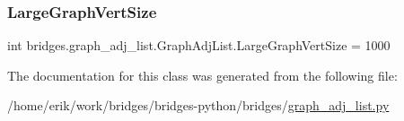 \subsubsection{\texorpdfstring{Large\+Graph\+Vert\+Size}{LargeGraphVertSize}}
{\footnotesize\ttfamily int bridges.\+graph\+\_\+adj\+\_\+list.\+Graph\+Adj\+List.\+Large\+Graph\+Vert\+Size = 1000\hspace{0.3cm}{\ttfamily [static]}}



The documentation for this class was generated from the following file\+:\begin{DoxyCompactItemize}
\item 
/home/erik/work/bridges/bridges-\/python/bridges/\hyperlink{graph__adj__list_8py}{graph\+\_\+adj\+\_\+list.\+py}\end{DoxyCompactItemize}
